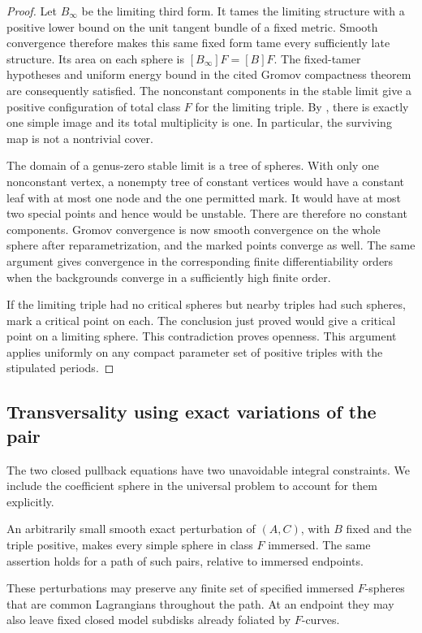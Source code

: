 \begin{proof}
Let $B_\infty$ be the limiting third form.  It tames the limiting
structure with a positive lower bound on the unit tangent bundle of a
fixed metric.  Smooth convergence therefore makes this same fixed form
tame every sufficiently late structure.  Its area on each sphere is
$[B_\infty]F=[B]F$.  The fixed-tamer hypotheses and uniform energy
bound in the cited Gromov compactness theorem are consequently satisfied.
The nonconstant components in the stable
limit give a positive configuration of total class $F$ for the limiting
triple.  By , there is exactly one simple image
and its total multiplicity is one.  In particular, the surviving map
is not a nontrivial cover.

The domain of a genus-zero stable limit is a tree of spheres.  With
only one nonconstant vertex, a nonempty tree of constant vertices would
have a constant leaf with at most one node and the one permitted mark.
It would have at most two special points and hence would be unstable.
There are therefore no constant components.  Gromov convergence is now
smooth convergence on the whole sphere after reparametrization, and
the marked points converge as well.  The same argument gives convergence
in the corresponding finite differentiability orders when the
backgrounds converge in a sufficiently high finite order.

If the limiting triple had no critical spheres but nearby triples had
such spheres, mark a critical point on each.  The conclusion just proved
would give a critical point on a limiting sphere.  This contradiction
proves openness.  This argument applies uniformly on any compact
parameter set of positive triples with the stipulated periods.
\end{proof}

\subsection{Transversality using exact variations of the pair}

The two closed pullback equations have two unavoidable integral
constraints.  We include the coefficient sphere in the universal
problem to account for them explicitly.

\begin{lemma}\label{lem:pencil-jets}
An arbitrarily small smooth exact perturbation of $(A,C)$, with $B$
fixed and the triple positive, makes every simple sphere in class $F$
immersed.  The same assertion holds for a path of such pairs, relative
to immersed endpoints.

These perturbations may preserve any finite set of specified immersed
$F$-spheres that are common Lagrangians throughout the path.  At an
endpoint they may also leave fixed closed model subdisks already
foliated by $F$-curves.
\end{lemma}

